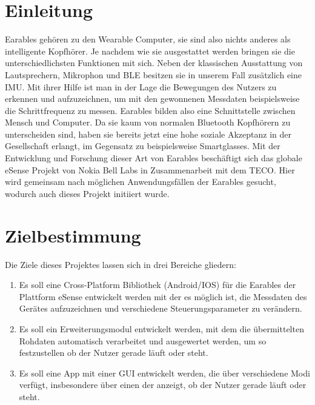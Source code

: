 \documentclass[a4paper,12pt]{article}
\title{\projektName}
\date{\today}
\begin{document}
 \setcounter{page}{2}
 \tableofcontents          %
 \clearpage

\section{Einleitung}
\Gls{Earables} gehören zu den \Gls{Wearable Computer}, sie sind also nichts anderes als intelligente Kopfhörer. Je nachdem wie sie ausgestattet werden bringen sie die unterschiedlichsten Funktionen mit sich. Neben der klassischen Ausstattung von Lautsprechern, Mikrophon und \gls{BLE} besitzen sie in unserem Fall zusätzlich eine \Gls{IMU}. Mit ihrer Hilfe ist man in der Lage die Bewegungen des Nutzers zu erkennen und aufzuzeichnen, um mit den gewonnenen Messdaten  beispielsweise die \Gls{Schrittfrequenz} zu messen.  \Gls{Earables} bilden also eine Schnittstelle zwischen Mensch und Computer. Da sie kaum von normalen Bluetooth Kopfhörern zu unterscheiden sind, haben sie bereits jetzt eine hohe soziale Akzeptanz in der Gesellschaft erlangt, im Gegensatz zu beispielsweise Smartglasses. Mit der Entwicklung und Forschung dieser Art von \Gls{Earables} beschäftigt sich das globale eSense Projekt von Nokia Bell Labs in Zusammenarbeit mit dem TECO. Hier wird gemeinsam nach möglichen Anwendungsfällen der \Gls{Earables} gesucht, wodurch auch dieses Projekt initiiert wurde.
\section{Zielbestimmung}
Die Ziele dieses Projektes lassen sich in drei Bereiche gliedern:
\begin{enumerate}

  \item Es soll eine \Gls{Cross-Platform Bibliothek} (Android/IOS) für die \Gls{Earables} der Plattform eSense entwickelt werden mit der es möglich ist, die Messdaten des Gerätes aufzuzeichnen und verschiedene \Gls{Steuerungsparameter} zu verändern.
  
  \item Es soll ein Erweiterungsmodul entwickelt werden, mit dem die übermittelten  \Gls{Rohdaten} automatisch verarbeitet und ausgewertet werden, um so festzustellen ob der Nutzer gerade läuft oder steht.
  
  \item Es soll eine App mit einer \Gls{GUI} entwickelt werden, die über verschiedene Modi verfügt, insbesondere über einen der anzeigt, ob der Nutzer gerade läuft oder steht. 

\end{enumerate}
\end{document}
